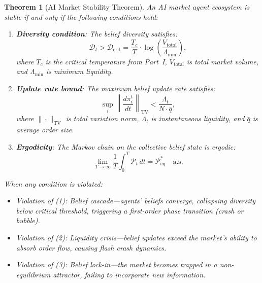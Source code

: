 \documentclass[12pt,a4paper]{article}
\newtheorem{theorem}{Theorem}[section]
\theoremstyle{definition}
\newcommand{\PP}{\mathcal{P}}
\begin{document}
\begin{theorem}[AI Market Stability Theorem]\label{thm:stability}
An AI market agent ecosystem is stable if and only if the following conditions hold:
\begin{enumerate}
  \item \textbf{Diversity condition}: The belief diversity satisfies:
  \begin{equation}\label{eq:diversity-condition}
    \mathcal{D}_t > \mathcal{D}_{\mathrm{crit}} = \frac{T_c}{T} \cdot \log\left(\frac{V_{\mathrm{total}}}{\Lambda_{\mathrm{min}}}\right),
  \end{equation}
  where $T_c$ is the critical temperature from Part~I, $V_{\mathrm{total}}$ is total market volume, and $\Lambda_{\mathrm{min}}$ is minimum liquidity.

  \item \textbf{Update rate bound}: The maximum belief update rate satisfies:
  \begin{equation}\label{eq:update-bound}
    \sup_i \left\|\frac{d\pi_i^t}{dt}\right\|_{\mathrm{TV}} < \frac{\Lambda_t}{N \cdot \bar{q}},
  \end{equation}
  where $\|\cdot\|_{\mathrm{TV}}$ is total variation norm, $\Lambda_t$ is instantaneous liquidity, and $\bar{q}$ is average order size.

  \item \textbf{Ergodicity}: The Markov chain on the collective belief state is ergodic:
  \begin{equation}
    \lim_{T \to \infty} \frac{1}{T}\int_0^T \PP_t\, dt = \PP^*_{\mathrm{eq}} \quad \text{a.s.}
  \end{equation}
\end{enumerate}

When any condition is violated:
\begin{itemize}
  \item Violation of (1): \emph{Belief cascade}---agents' beliefs converge, collapsing diversity below critical threshold, triggering a first-order phase transition (crash or bubble).
  \item Violation of (2): \emph{Liquidity crisis}---belief updates exceed the market's ability to absorb order flow, causing flash crash dynamics.
  \item Violation of (3): \emph{Belief lock-in}---the market becomes trapped in a non-equilibrium attractor, failing to incorporate new information.
\end{itemize}
\end{theorem}
\end{document}
